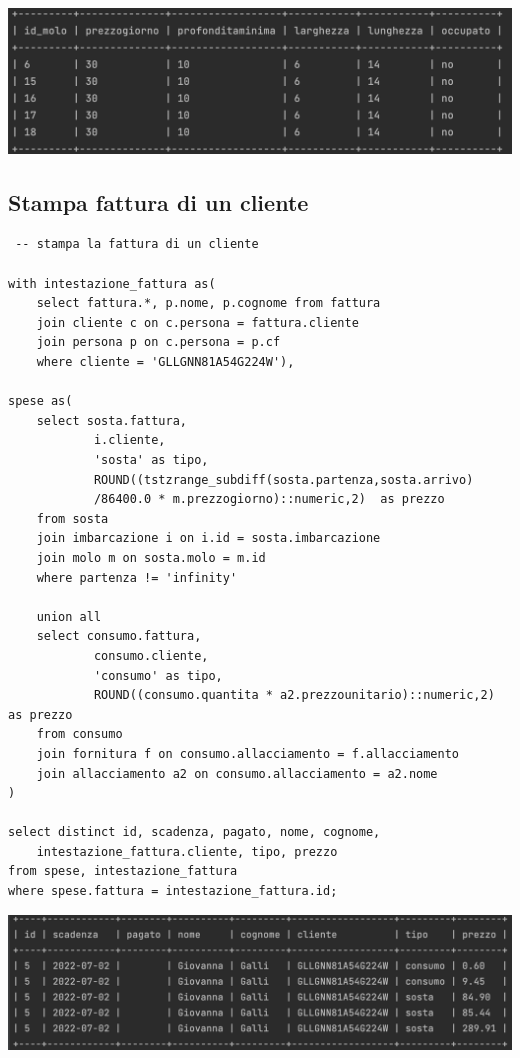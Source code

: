 \begin{center}
    \includegraphics[width= 0.8\linewidth]{img/result_molidisponibili.png}
\end{center}

\subsection{Stampa fattura di un cliente}

\begin{lstlisting}
 -- stampa la fattura di un cliente

with intestazione_fattura as(
    select fattura.*, p.nome, p.cognome from fattura
    join cliente c on c.persona = fattura.cliente
    join persona p on c.persona = p.cf
    where cliente = 'GLLGNN81A54G224W'),

spese as(
    select sosta.fattura,
            i.cliente,
            'sosta' as tipo,
            ROUND((tstzrange_subdiff(sosta.partenza,sosta.arrivo)
            /86400.0 * m.prezzogiorno)::numeric,2)  as prezzo
    from sosta
    join imbarcazione i on i.id = sosta.imbarcazione
    join molo m on sosta.molo = m.id
    where partenza != 'infinity'

    union all
    select consumo.fattura,
            consumo.cliente,
            'consumo' as tipo,
            ROUND((consumo.quantita * a2.prezzounitario)::numeric,2) as prezzo
    from consumo
    join fornitura f on consumo.allacciamento = f.allacciamento
    join allacciamento a2 on consumo.allacciamento = a2.nome
)

select distinct id, scadenza, pagato, nome, cognome,
    intestazione_fattura.cliente, tipo, prezzo
from spese, intestazione_fattura
where spese.fattura = intestazione_fattura.id;
\end{lstlisting}

\includegraphics[width = \linewidth]{img/result_fattura.png}

